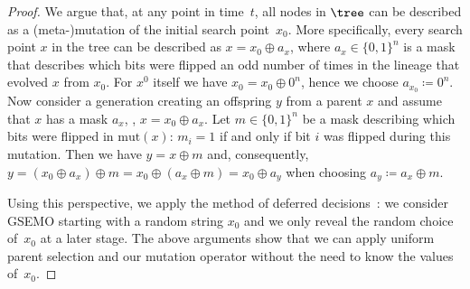 \begin{proof}
    We argue that, at any point in time~$t$, all nodes in $\tree$ can be described as a (meta-)mutation of the initial search point~$x_0$. More specifically, every search point $x$ in the tree can be described as $x = x_0 \oplus a_x$, where $a_x \in \{0, 1\}^n$ is a mask that describes which bits were flipped an odd number of times in the lineage that evolved $x$ from $x_0$. For $x^0$ itself we have $x_0 = x_0 \oplus 0^n$, hence we choose $a_{x_0} \coloneqq 0^n$. Now consider a generation creating an offspring $y$ from a parent $x$ and assume that $x$ has a mask $a_x$, \ie, $x = x_0 \oplus a_x$. Let $m \in \{0, 1\}^n$ be a mask describing which bits were flipped in $\mathrm{mut}(x)$: $m_i = 1$ if and only if bit $i$ was flipped during this mutation. Then we have $y = x \oplus m$ and, consequently, $y = (x_0 \oplus a_x) \oplus m = x_0 \oplus (a_x \oplus m) = x_0 \oplus a_y$ when choosing $a_y \coloneqq a_x \oplus m$.

    Using this perspective, we apply the method of deferred decisions~\cite[Section~3.5]{Motwani1995}: we consider GSEMO starting with a random string $x_0$ and we only reveal the random choice of~$x_0$ at a later stage. The above arguments
    show that we can apply uniform parent selection and our mutation operator without the need to know the values of~$x_0$.


\end{proof}
